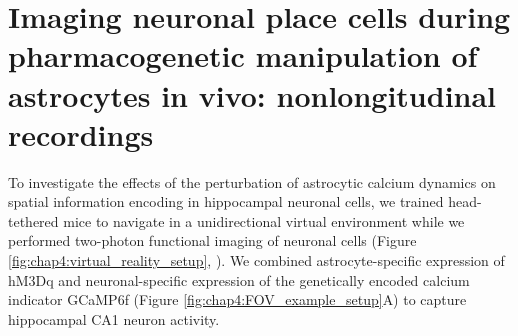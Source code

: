 
\section{Imaging neuronal place cells during pharmacogenetic manipulation of astrocytes in vivo: nonlongitudinal recordings}
\label{chap4:sec:3:linear_track}
To investigate the effects of the perturbation of astrocytic calcium dynamics on spatial information encoding in hippocampal neuronal cells, we trained head-tethered mice to navigate in a unidirectional virtual environment while we performed two-photon functional imaging of neuronal cells (Figure \ref{fig:chap4:virtual_reality_setup}, \cite{saleem2018coherent}). 
We combined astrocyte-specific expression of hM3Dq and neuronal-specific expression of the genetically encoded calcium indicator GCaMP6f (Figure \ref{fig:chap4:FOV_example_setup}A) to capture hippocampal CA1 neuron activity.
